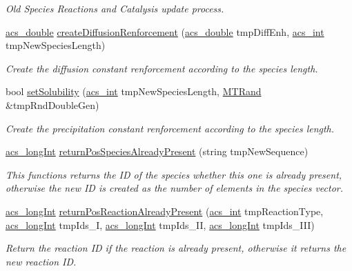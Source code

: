 \begin{DoxyCompactItemize}
\begin{DoxyCompactList}\small\item\em Old Species Reactions and Catalysis update process. \end{DoxyCompactList}\item 
\hyperlink{a00016_ab776853a005fcbf56af0424a2a4dd607}{acs\-\_\-double} \hyperlink{a00003_af795a4d1f04dfbfcbdf321e20e74f9c2}{create\-Diffusion\-Renforcement} (\hyperlink{a00016_ab776853a005fcbf56af0424a2a4dd607}{acs\-\_\-double} tmp\-Diff\-Enh, \hyperlink{a00016_a8d277355641a098190360234e2ebde35}{acs\-\_\-int} tmp\-New\-Species\-Length)
\begin{DoxyCompactList}\small\item\em Create the diffusion constant renforcement according to the species length. \end{DoxyCompactList}\item 
bool \hyperlink{a00003_a496ba50d3a345cd842ce42406946405c}{set\-Solubility} (\hyperlink{a00016_a8d277355641a098190360234e2ebde35}{acs\-\_\-int} tmp\-New\-Species\-Length, \hyperlink{a00008}{M\-T\-Rand} \&tmp\-Rnd\-Double\-Gen)
\begin{DoxyCompactList}\small\item\em Create the precipitation constant renforcement according to the species length. \end{DoxyCompactList}\item 
\hyperlink{a00016_a19319d75f02db4308bc5c0026d98cd85}{acs\-\_\-long\-Int} \hyperlink{a00003_a4e26cc574e20a5afcfbbe5887109c5af}{return\-Pos\-Species\-Already\-Present} (string tmp\-New\-Sequence)
\begin{DoxyCompactList}\small\item\em This functions returns the I\-D of the species whether this one is already present, otherwise the new I\-D is created as the number of elements in the species vector. \end{DoxyCompactList}\item 
\hyperlink{a00016_a19319d75f02db4308bc5c0026d98cd85}{acs\-\_\-long\-Int} \hyperlink{a00003_a6feec5685b519ba0cdae0e5c59dffff0}{return\-Pos\-Reaction\-Already\-Present} (\hyperlink{a00016_a8d277355641a098190360234e2ebde35}{acs\-\_\-int} tmp\-Reaction\-Type, \hyperlink{a00016_a19319d75f02db4308bc5c0026d98cd85}{acs\-\_\-long\-Int} tmp\-Ids\-\_\-\-I, \hyperlink{a00016_a19319d75f02db4308bc5c0026d98cd85}{acs\-\_\-long\-Int} tmp\-Ids\-\_\-\-I\-I, \hyperlink{a00016_a19319d75f02db4308bc5c0026d98cd85}{acs\-\_\-long\-Int} tmp\-Ids\-\_\-\-I\-I\-I)
\begin{DoxyCompactList}\small\item\em Return the reaction I\-D if the reaction is already present, otherwise it returns the new reaction I\-D. \end{DoxyCompactList}\item 

\end{DoxyCompactItemize}
